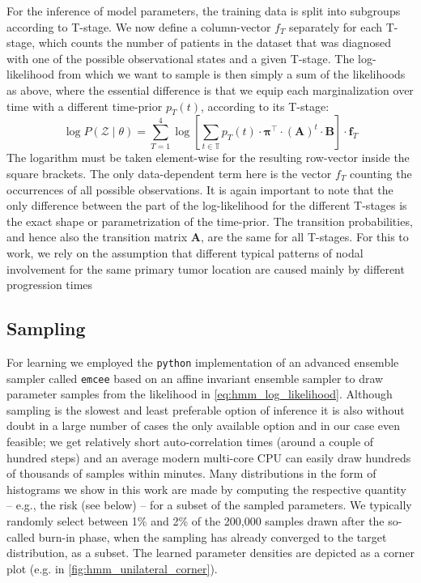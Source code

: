 \documentclass[../ms.tex]{subfiles}
\begin{document}
For the inference of model parameters, the training data is split into subgroups according to T-stage. We now define a column-vector $f_T$ separately for each T-stage, which counts the number of patients in the dataset that was diagnosed with one of the possible observational states and a given T-stage. The log-likelihood from which we want to sample is then simply a sum of the likelihoods as above, where the essential difference is that we equip each marginalization over time with a different time-prior $p_T (t)$, according to its T-stage:
%
\begin{equation} \label{eq:hmm_log_likelihood}
    \log{P \left( \boldsymbol{\mathcal{Z}} \mid \theta \right)} = \sum_{T=1}^{4}{\log{\left[ \sum_{t \in \mathbb{T}}{p_T (t) \cdot \boldsymbol{\pi}^\top \cdot (\mathbf{A})^t \cdot \mathbf{B}} \right]} \cdot \mathbf{f}_T}
\end{equation}
%
The logarithm must be taken element-wise for the resulting row-vector inside the square brackets. The only data-dependent term here is the vector $f_T$ counting the occurrences of all possible observations. It is again important to note that the only difference between the part of the log-likelihood for the different T-stages is the exact shape or parametrization of the time-prior. The transition probabilities, and hence also the transition matrix $\mathbf{A}$, are the same for all T-stages. For this to work, we rely on the assumption that different typical patterns of nodal involvement for the same primary tumor location are caused mainly by different progression times

\subsection{Sampling}
\label{subsec:hmm_sampling}

For learning we employed the \verb|python| implementation of an advanced ensemble sampler called \verb|emcee| \cite{foreman-mackey_emcee_2013} based on an affine invariant ensemble sampler \cite{goodman_ensemble_2010} to draw parameter samples from the likelihood in \cref{eq:hmm_log_likelihood}. Although sampling is the slowest and least preferable option of inference it is also without doubt in a large number of cases the only available option and in our case even feasible; we get relatively short auto-correlation times (around a couple of hundred steps) and an average modern multi-core CPU can easily draw hundreds of thousands of samples within minutes.
Many distributions in the form of histograms we show in this work are made by computing the respective quantity – e.g., the risk (see below) – for a subset of the sampled parameters. We typically randomly select between 1\% and 2\% of the 200,000 samples drawn after the so-called burn-in phase, when the sampling has already converged to the target distribution, as a subset. The learned parameter densities are depicted as a corner \cite{foreman-mackey_cornerpy_2016} plot (e.g. in \cref{fig:hmm_unilateral_corner}).
\end{document}
